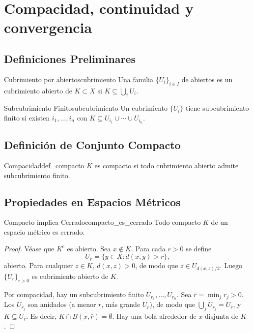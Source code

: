 \documentclass[11pt, a4paper]{article}
\begin{document}
\newpage

\section{Compacidad, continuidad y convergencia}

\subsection{Definiciones Preliminares}

\begin{definicion}{Cubrimiento por abiertos}{cubrimiento}
Una familia $\{U_i\}_{i \in I}$ de abiertos es un cubrimiento abierto de $K \subset X$ si
$K \subseteq \bigcup_i U_i$.
\end{definicion}

\begin{definicion}{Subcubrimiento Finito}{subcubrimiento}
Un cubrimiento $\{U_i\}$ tiene subcubrimiento finito si existen $i_1, \dots, i_n$ con
$K \subseteq U_{i_1} \cup \cdots \cup U_{i_n}$.
\end{definicion}

\subsection{Definición de Conjunto Compacto}

\begin{definicion}{Compacidad}{def_compacto}
$K$ es compacto si todo cubrimiento abierto admite subcubrimiento finito.
\end{definicion}

\subsection{Propiedades en Espacios Métricos}

\begin{proposicion}{Compacto implica Cerrado}{compacto_es_cerrado}
Todo compacto $K$ de un espacio métrico es cerrado.
\end{proposicion}

\begin{proof}
Véase que $K^c$ es abierto. Sea $x \notin K$. Para cada $r > 0$ se define
$$ U_r = \{y \in X : d(x, y) > r\}, $$
abierto. Para cualquier $z \in K$, $d(x,z) > 0$, de modo que $z \in U_{d(x,z)/2}$. Luego
$\{U_r\}_{r > 0}$ es cubrimiento abierto de $K$.

Por compacidad, hay un subcubrimiento finito $U_{r_1}, \dots, U_{r_n}$. Sea
$\bar{r} = \min_j r_j > 0$. Los $U_{r_j}$ son anidados (a menor $r$, más grande $U_r$), de modo que
$\bigcup_j U_{r_j} = U_{\bar r}$, y $K \subseteq U_{\bar r}$. Es decir,
$K \cap \overline{B(x, \bar r)} = \emptyset$. Hay una bola alrededor de $x$ disjunta de $K$.
\end{proof}
\end{document}
